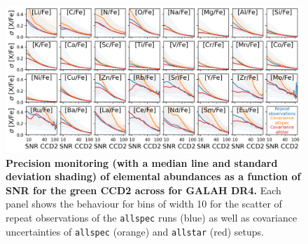 \documentclass[
  journal=pasa,
  manuscript=research-paper, %
  year=2024,
  volume=37
]{cup-journal}
\begin{document}
\begin{figure}[ht]
 \centering
 \includegraphics[width=\textwidth]{figures/galah_dr4_precision_abundances.png}
 \caption{\textbf{Precision monitoring (with a median line and standard deviation shading) of elemental abundances as a function of SNR for the green CCD2 across for GALAH DR4.} Each panel shows the behaviour for bins of width 10 for the scatter of repeat observations of the \texttt{allspec} runs (blue) as well as covariance uncertainties of \texttt{allspec} (orange) and \texttt{allstar} (red) setups.}
 \label{fig:galah_dr4_precision_abundances}
\end{figure}
\end{document}
